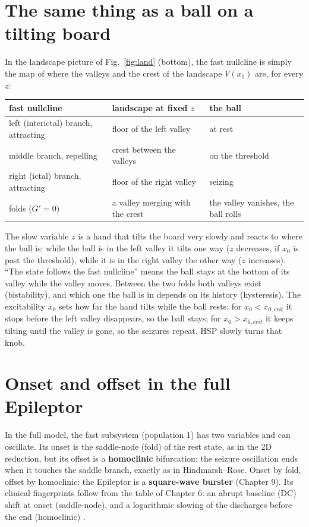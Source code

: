 \documentclass[11pt,openany]{report}
\begin{document}
\section{The same thing as a ball on a tilting board}
In the landscape picture of Fig.~\ref{fig:land} (bottom), the fast nullcline is simply the map of where the valleys and the
crest of the landscape $V(x_1)$ are, for every $z$:
\begin{center}\small
\begin{tabular}{lll}
\toprule
fast nullcline & landscape at fixed $z$ & the ball \\
\midrule
left (interictal) branch, attracting & floor of the left valley & at rest \\
middle branch, repelling & crest between the valleys & on the threshold \\
right (ictal) branch, attracting & floor of the right valley & seizing \\
folds ($G'=0$) & a valley merging with the crest & the valley vanishes, the ball rolls \\
\bottomrule
\end{tabular}
\end{center}
The slow variable $z$ is a hand that tilts the board very slowly and reacts to where the ball is: while the ball is in the
left valley it tilts one way ($z$ decreases, if $x_0$ is past the threshold), while it is in the right valley the other way
($z$ increases). ``The state follows the fast nullcline'' means the ball stays at the bottom of its valley while the valley
moves. Between the two folds both valleys exist (bistability), and which one the ball is in depends on its history
(hysteresis). The excitability $x_0$ sets how far the hand tilts while the ball rests: for $x_0<x_{0,crit}$ it stops before
the left valley disappears, so the ball stays; for $x_0>x_{0,crit}$ it keeps tilting until the valley is gone, so the
seizures repeat. HSP slowly turns that knob.

\section{Onset and offset in the full Epileptor}
In the full model, the fast subsystem (population 1) has two variables and can oscillate. Its onset is the saddle-node
(fold) of the rest state, as in the 2D reduction, but its offset is a \textbf{homoclinic} bifurcation: the seizure
oscillation ends when it touches the saddle branch, exactly as in Hindmarsh--Rose. Onset by fold, offset by homoclinic:
the Epileptor is a \textbf{square-wave burster} (Chapter 9). Its clinical fingerprints follow from the table of Chapter 6:
an abrupt baseline (DC) shift at onset (saddle-node), and a logarithmic slowing of the discharges before the end
(homoclinic) \cite{jirsa2014}.
\end{document}
